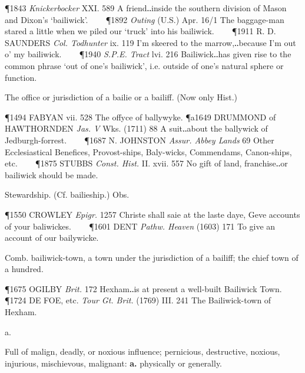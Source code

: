 \begin{description}[wide, labelwidth=!, labelindent=0pt]
\begin{myenumerate}
\P 1843 \textit{Knickerbocker}  XXI. 589 A friend‥inside the southern division of Mason and Dixon's ‘bailiwick’.    
\P 1892 \textit{Outing}  (U.S.) Apr. 16/1 The baggage-man stared a little when we piled our ‘truck’ into his bailiwick.    
\P 1911 R. D. SAUNDERS  \textit{Col. Todhunter} ix. 119 I'm skeered to the marrow,‥because I'm out o' my bailiwick.    
\P 1940 \textit{S.P.E. Tract} lvi. 216 Bailiwick‥has given rise to the common phrase ‘out of one's bailiwick’, i.e. outside of one's natural sphere or function.

 The office or jurisdiction of a bailie or a bailiff. (Now only Hist.)

\P 1494 FABYAN vii. 528 The offyce of ballywyke.
\P a1649 DRUMMOND of HAWTHORNDEN \textit{Jas. V} Wks. (1711) 88 A suit‥about the ballywick of Jedburgh-forrest.    
\P 1687 N. JOHNSTON  \textit{Assur. Abbey Lands} 69 Other Ecclesiastical Benefices, Provost-ships, Baly-wicks, Commendams, Canon-ships, etc.    
\P 1875 STUBBS  \textit{Const. Hist.} II. xvii. 557 No gift of land, franchise‥or bailiwick should be made.

 Stewardship. (Cf. bailieship.) Obs.

\P 1550 CROWLEY \textit{Epigr.} 1257 Christe shall saie at the laste daye, Geve accounts of your baliwickes.    
\P 1601 DENT  \textit{Pathw. Heaven} (1603) 171 To give an account of our bailywicke.

 Comb. bailiwick-town, a town under the jurisdiction of a bailiff; the chief town of a hundred.

\P 1675 OGILBY  \textit{Brit.} 172 Hexham‥is at present a well-built Bailiwick Town.    
\P 1724 DE FOE, etc. \textit{Tour Gt. Brit.} (1769) III. 241 The Bailiwick-town of Hexham.
\end{myenumerate}


 a.

\noindent {}

\vspace{-0.3cm}

\begin{myenumerate}

 Full of malign, deadly, or noxious influence; pernicious,
destructive, noxious, injurious, mischievous, malignant: \textbf{a.} physically or generally.


\end{myenumerate}
\end{description}
